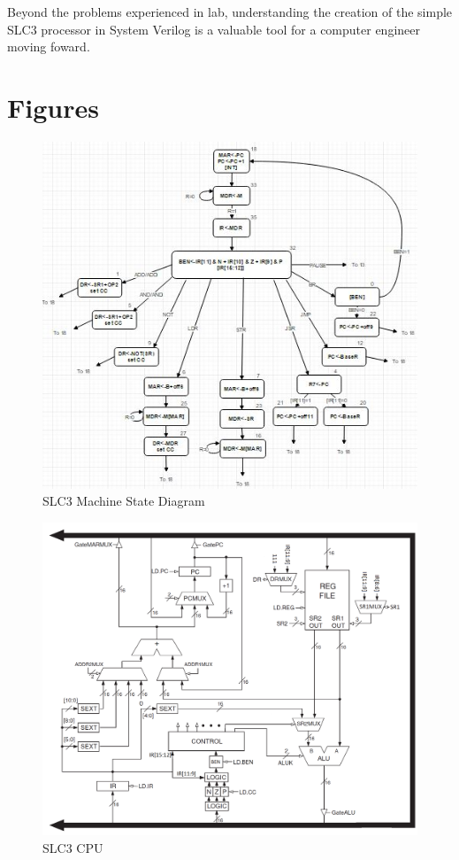 \documentclass[journal, twocolumn, final,11pt,letterpaper]{IEEEtran}
\begin{document}
Beyond the problems experienced in lab, understanding the creation of the simple SLC3 processor in System Verilog is a valuable tool for a computer engineer moving foward.   \\      



\clearpage
\onecolumn
\section{Figures}

\begin{figure} [htbp]
	\centering	
	\includegraphics[scale=1]{state-diagram.jpg}
	\caption{SLC3 Machine State Diagram	\label{fig:state-diagram}}
\end{figure}


\begin{figure} [htbp]
	\centering
	\includegraphics[scale=0.27]{SLC3_Circuit.png}
	\caption{SLC3 CPU \label{fig:SLC3-Circuit}}
\end{figure}
\end{document}
